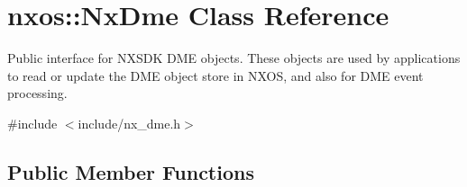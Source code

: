 \hypertarget{classnxos_1_1_nx_dme}{}\section{nxos\+:\+:Nx\+Dme Class Reference}
\label{classnxos_1_1_nx_dme}


Public interface for N\+X\+S\+DK D\+ME objects. These objects are used by applications to read or update the D\+ME object store in N\+X\+OS, and also for D\+ME event processing.  




{\ttfamily \#include $<$include/nx\+\_\+dme.\+h$>$}

\subsection*{Public Member Functions}
